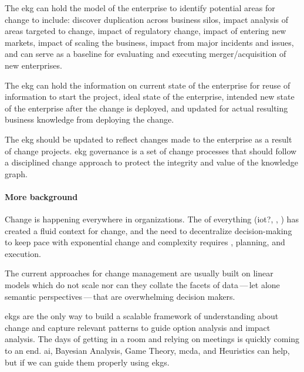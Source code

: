 %
%

\ekgmmContextSection

\ekgmmHowEKGAffectsThisCapability

The \gls{ekg} can hold the model of the enterprise to identify potential areas for change to include:
discover duplication across business silos, impact analysis of areas targeted to change,
impact of regulatory change, impact of entering new markets, impact of scaling the business,
impact from major incidents and issues, and can serve as a baseline for evaluating and executing
merger/acquisition of new enterprises.

The \gls{ekg} can hold the information on current state of the enterprise for reuse of information to start the
project, ideal state of the enterprise, intended new state of the enterprise after the change is deployed,
and updated for actual resulting business knowledge from deploying the change.

\ekgmmHowEKGRequiresThisCapability

The \gls{ekg} should be updated to reflect changes made to the enterprise as a result of change projects.
\gls{ekg} governance is a set of change processes that
should follow a disciplined change approach to protect the integrity and value of the knowledge graph.

\paragraph*{More background}

Change is happening everywhere in organizations.
The  of everything (\gls{iot}?, , )
has created a fluid context for change, and the need to decentralize decision-making to keep pace with
exponential change and complexity requires , planning, and execution.

The current approaches for change management are usually built on linear models which do not scale nor can they collate
the facets of data\,---\,let alone semantic perspectives\,---\,that are overwhelming decision makers.

\Glspl{ekg} are the only way to build a scalable framework of understanding about change and capture relevant patterns
to guide option analysis and impact analysis.
The days of getting in a room and relying on meetings is quickly coming to an end.
\Gls{ai}, Bayesian Analysis, Game Theory, \gls{mcda},
and Heuristics can help, but  if we can guide them properly using \glspl{ekg}.

